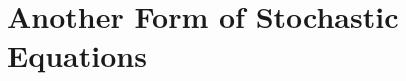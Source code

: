 \documentclass[11pt,onecolumn]{IEEEtran}  %
\newcommand{\Ab}{\mathbb{A}}
\newcommand{\Kb}{\mathbb{K}}
\newcommand{\iid}{\overset{\mathrm{iid}}{\sim}}
\DeclarePairedDelimiter{\set}{\{}{\}}
\newtheorem{corollary}{Corollary}
\theoremstyle{definition}
\begin{document}
% 


\section{%
    Another Form of Stochastic Equations
} \label{sec:pomdp1}
\end{document}
